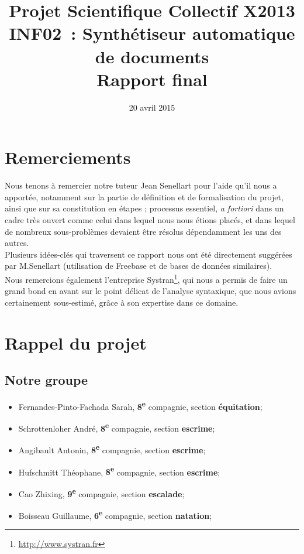 \documentclass[a4paper, 12pt]{article}
\title{Projet Scientifique Collectif X2013 \\INF02~: Synthétiseur automatique de documents \\Rapport final}
\author{\membres} %
\date{20 avril 2015}
\begin{document}
\titrelong{}


\tableofcontents
\newpage

\section*{Remerciements}

Nous tenons à remercier notre tuteur Jean Senellart pour l'aide qu'il nous a apportée, notamment sur la partie de définition et de formalisation du projet, ainsi que sur sa constitution en étapes ; processus essentiel, \textit{a fortiori} dans un cadre très ouvert comme celui dans lequel nous nous étions placés, et dans lequel de nombreux sous-problèmes devaient être résolus dépendamment les uns des autres.\\

Plusieurs idées-clés qui traversent ce rapport nous ont été directement suggérées par M.Senellart (utilisation de Freebase et de bases de données similaires).\\

Nous remercions également l'entreprise Systran\footnote{\href{http://www.systran.fr}{http://www.systran.fr}}, qui nous a permis de faire un grand bond en avant sur le point délicat de l'analyse syntaxique, que nous avions certainement sous-estimé, grâce à son expertise dans ce domaine.


\section{Rappel du projet}

\subsection{Notre groupe}
\begin{itemize}
 \item Fernandes-Pinto-Fachada Sarah, \textbf{8\textsuperscript{e}} compagnie, section \textbf{équitation};
 \item Schrottenloher André, \textbf{8\textsuperscript{e}} compagnie, section \textbf{escrime};
 \item Angibault Antonin, \textbf{8\textsuperscript{e}} compagnie, section \textbf{escrime};
 \item Hufschmitt Théophane, \textbf{8\textsuperscript{e}} compagnie, section \textbf{escrime};
 \item Cao Zhixing, \textbf{9\textsuperscript{e}} compagnie, section \textbf{escalade};
 \item Boisseau Guillaume, \textbf{6\textsuperscript{e}} compagnie, section \textbf{natation};
\end{itemize}
\end{document}
